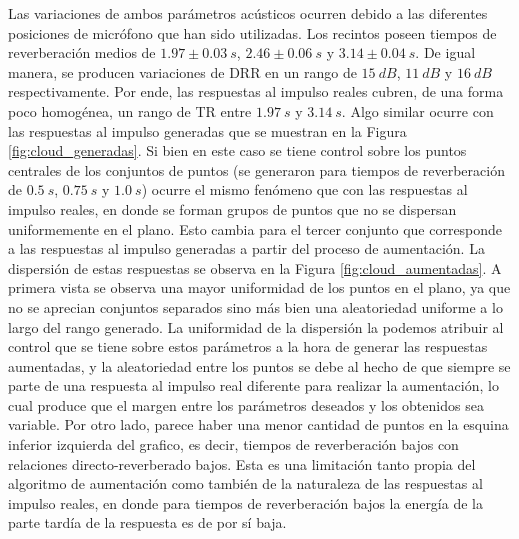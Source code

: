 Las variaciones de ambos parámetros acústicos ocurren debido a las diferentes posiciones de micrófono que han sido utilizadas. Los recintos poseen tiempos de reverberación medios de $1.97 \pm 0.03 \ s$, $2.46 \pm 0.06 \ s$ y $3.14 \pm 0.04	\ s$. De igual manera, se producen variaciones de DRR en un rango de  $15 \ dB$, $11 \ dB$ y $16 \ dB$ respectivamente. Por ende, las respuestas al impulso reales cubren, de una forma poco homogénea, un rango de TR entre $1.97 \ s$ y $3.14 \ s$. Algo similar ocurre con las respuestas al impulso generadas que se muestran en la Figura \ref{fig:cloud_generadas}. Si bien en este caso se tiene control sobre los puntos centrales de los conjuntos de puntos (se generaron para tiempos de reverberación de $0.5 \ s$, $0.75 \ s$ y $1.0 \ s$) ocurre el mismo fenómeno que con las respuestas al impulso reales, en donde se forman grupos de puntos que no se dispersan uniformemente en el plano. Esto cambia para el tercer conjunto que corresponde a las respuestas al impulso generadas a partir del proceso de aumentación. La dispersión de estas respuestas se observa en la Figura \ref{fig:cloud_aumentadas}. A primera vista se observa una mayor uniformidad de los puntos en el plano, ya que no se aprecian conjuntos separados sino más bien una aleatoriedad uniforme a lo largo del rango generado. La uniformidad de la dispersión la podemos atribuir al control que se tiene sobre estos parámetros a la hora de generar las respuestas aumentadas, y la aleatoriedad entre los puntos se debe al hecho de que siempre se parte de una respuesta al impulso real diferente para realizar la aumentación, lo cual produce que el margen entre los parámetros deseados y los obtenidos sea variable. Por otro lado, parece haber una menor cantidad de puntos en la esquina inferior izquierda del grafico, es decir, tiempos de reverberación bajos con relaciones directo-reverberado bajos. Esta es una limitación tanto propia del algoritmo de aumentación como también de la naturaleza de las respuestas al impulso reales, en donde para tiempos de reverberación bajos la energía de la parte tardía de la respuesta es de por sí baja. 





